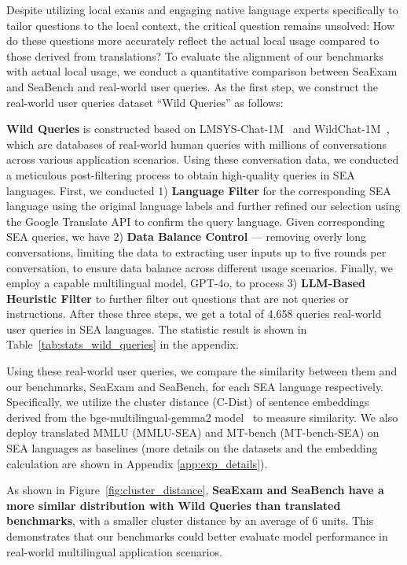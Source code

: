Despite utilizing local exams and engaging native language experts specifically to tailor questions to the local context, the critical question remains unsolved: How do these questions more accurately reflect the actual local usage compared to those derived from translations? 
To evaluate the alignment of our benchmarks with actual local usage, we conduct a quantitative comparison between SeaExam and SeaBench and real-world user queries. As the first step, we construct the real-world user queries dataset ``Wild Queries'' as follows:

\textbf{Wild Queries} is constructed based on LMSYS-Chat-1M~\cite{zheng_lmsys-chat-1m_2023} and WildChat-1M~\cite{zhao2024wildchat,deng2024wildvisopensourcevisualizer}, which are databases of real-world human queries with millions of conversations across various application scenarios. Using these conversation data, we conducted a meticulous post-filtering process to obtain high-quality queries in SEA languages. First, we conducted 1) \textbf{Language Filter} for the corresponding SEA language using the original language labels and further refined our selection using the Google Translate API to confirm the query language. Given corresponding SEA queries, we have 2) \textbf{Data Balance Control} --- removing overly long conversations, limiting the data to extracting user inputs up to five rounds per conversation, to ensure data balance across different usage scenarios. Finally, we employ a capable multilingual model, GPT-4o, to process 3) \textbf{LLM-Based Heuristic Filter} to further filter out questions that are not queries or instructions.
After these three steps, we get a total of 4,658 queries real-world user queries in SEA languages. The statistic result is shown in Table~\ref{tab:stats_wild_queries} in the appendix.


Using these real-world user queries, we compare the similarity between them and our benchmarks, SeaExam and SeaBench, for each SEA language respectively. Specifically, we utilize the cluster distance (C-Dist) of sentence embeddings derived from the bge-multilingual-gemma2 model~\cite{bge-m3} to measure similarity. We also deploy translated MMLU (MMLU-SEA) and MT-bench (MT-bench-SEA) on SEA languages as baselines (more details on the datasets and the embedding calculation are shown in Appendix \ref{app:exp_details}).


As shown in Figure~\ref{fig:cluster_distance}, \textbf{SeaExam and SeaBench have a more similar distribution with Wild Queries than translated benchmarks}, with a smaller cluster distance by an average of 6 units. This demonstrates that our benchmarks could better evaluate model performance in real-world multilingual application scenarios.


